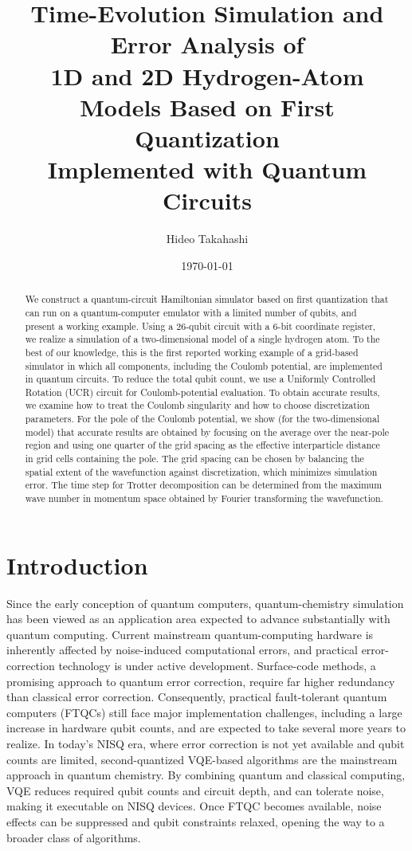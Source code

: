 \documentclass[a4paper,11pt]{article}
\begin{document}
\title
{Time-Evolution Simulation and Error Analysis of\\
1D and 2D Hydrogen-Atom Models Based on First Quantization\\
Implemented with Quantum Circuits}
\author{Hideo Takahashi}
\date{\today}
\maketitle
\begin{abstract}
We construct a quantum-circuit Hamiltonian simulator based on first
quantization that can run on a quantum-computer emulator with a limited number
of qubits, and present a working example. Using a 26-qubit circuit with a
6-bit coordinate register, we realize a simulation of a two-dimensional model
of a single hydrogen atom. To the best of our knowledge, this is the first
reported working example of a grid-based simulator in which all components,
including the Coulomb potential, are implemented in quantum circuits. To reduce
the total qubit count, we use a Uniformly Controlled Rotation (UCR) circuit for
Coulomb-potential evaluation. To obtain accurate results, we examine how to
treat the Coulomb singularity and how to choose discretization parameters. For
the pole of the Coulomb potential, we show (for the two-dimensional model) that
accurate results are obtained by focusing on the average over the near-pole
region and using one quarter of the grid spacing as the effective interparticle
distance in grid cells containing the pole. The grid spacing can be chosen by
balancing the spatial extent of the wavefunction against discretization, which
minimizes simulation error. The time step for Trotter decomposition can be
determined from the maximum wave number in momentum space obtained by Fourier
transforming the wavefunction.

\end{abstract}

\section{Introduction}
Since the early conception of quantum computers, quantum-chemistry simulation
has been viewed as an application area expected to advance substantially with
quantum computing. Current mainstream quantum-computing hardware is inherently
affected by noise-induced computational errors, and practical error-correction
technology is under active development. Surface-code methods, a promising
approach to quantum error correction, require far higher redundancy than
classical error correction. Consequently, practical fault-tolerant quantum
computers (FTQCs) still face major implementation challenges, including a large
increase in hardware qubit counts, and are expected to take several more years
to realize. In today’s NISQ era, where error correction is not yet available
and qubit counts are limited, second-quantized VQE-based algorithms are the
mainstream approach in quantum chemistry. By combining quantum and classical
computing, VQE reduces required qubit counts and circuit depth, and can tolerate
noise, making it executable on NISQ devices. Once FTQC becomes available,
noise effects can be suppressed and qubit constraints relaxed, opening the way
to a broader class of algorithms.
\end{document}
